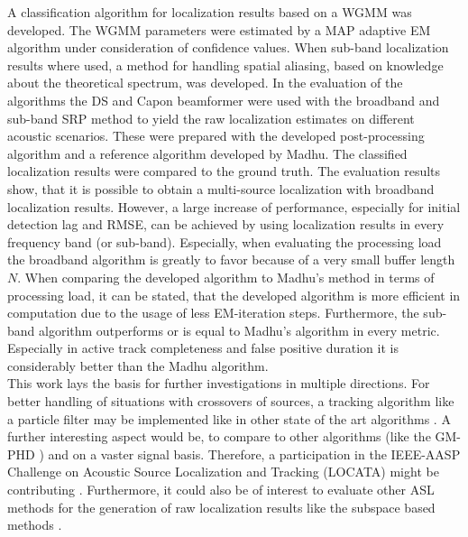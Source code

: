 A classification algorithm for localization results based on a \acl{WGMM} was developed. The \ac{WGMM} parameters were estimated by a \acl{MAP} adaptive \acl{EM} algorithm under consideration of confidence values. When sub-band localization results where used, a method for handling spatial aliasing, based on knowledge about the theoretical spectrum, was developed. In the evaluation of the algorithms the \acl{DS} and Capon beamformer were used with the broadband and sub-band \acl{SRP} method to yield the raw localization estimates on different acoustic scenarios. These were prepared with the developed post-processing algorithm and a reference algorithm developed by Madhu. The classified localization results were compared to the ground truth. The evaluation results show, that it is possible to obtain a multi-source localization with broadband localization results. However, a large increase of performance, especially for initial detection lag and \acl{RMSE}, can be achieved by using localization results in every frequency band (or sub-band). Especially, when evaluating the processing load the broadband algorithm is greatly to favor because of a very small buffer length~$N$. When comparing the developed algorithm to Madhu's method in terms of processing load, it can be stated, that the developed algorithm is more efficient in computation due to the usage of less EM-iteration steps. Furthermore, the sub-band algorithm outperforms or is equal to Madhu's algorithm in every metric. Especially in active track completeness and false positive duration it is considerably better than the Madhu algorithm.\\

This work lays the basis for further investigations in multiple directions.
For better handling of situations with crossovers of sources, a tracking algorithm like a particle filter may be implemented like in other state of the art algorithms \cite{valin2007robust,nikunen2018separation}. A further interesting aspect would be, to compare to other algorithms (like the GM-PHD \cite{evers2015bearing}) and on a vaster signal basis. Therefore, a participation in the IEEE-AASP Challenge on Acoustic Source Localization and Tracking (LOCATA) might be contributing \cite{LOCATA}. Furthermore, it could also be of interest to evaluate other \acl{ASL} methods for the generation of raw localization results like the subspace based methods \cite{1164667,yoon2006tops,pan2017frida,di2001waves}.


